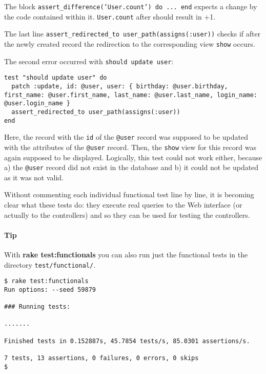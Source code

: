 \documentclass[a4paper]{book}
\newcounter{tab}[chapter]
\begin{document}
The block \texttt{assert\_difference('User.count') do ... end} expects a change by the code contained within it. \texttt{User.count} after should result in +1.

The last line \texttt{assert\_redirected\_to       user\_path(assigns(:user))} checks if after the newly created record the redirection to the corresponding view \texttt{show} occurs.

The second error occurred with \texttt{should update       user}:

\begin{shaded}\begin{verbatim}
test "should update user" do
  patch :update, id: @user, user: { birthday: @user.birthday, first_name: @user.first_name, last_name: @user.last_name, login_name: @user.login_name }
  assert_redirected_to user_path(assigns(:user))
end
\end{verbatim}\end{shaded}

Here, the record with the \texttt{id} of the \texttt{@user} record was supposed to be updated with the attributes of the \texttt{@user} record. Then, the \texttt{show} view for this record was again supposed to be displayed. Logically, this test could not work either, because a) the \texttt{@user} record did not exist in the database and b) it could not be updated as it was not valid.

Without commenting each individual functional test line by line, it is becoming clear what these tests do: they execute real queries to the Web interface (or actually to the controllers) and so they can be used for testing the controllers.

\paragraph{Tip}\label{tip-15}

With \textbf{rake test:functionals} you can also run just the functional tests in the directory \texttt{test/functional/}.

\begin{shaded}\begin{verbatim}
$ rake test:functionals
Run options: --seed 59879

### Running tests:

.......

Finished tests in 0.152887s, 45.7854 tests/s, 85.0301 assertions/s.

7 tests, 13 assertions, 0 failures, 0 errors, 0 skips
$
\end{verbatim}\end{shaded}
\end{document}

